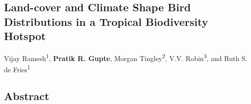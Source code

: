 \begin{refsection}

\chapter{Land-cover and Climate Shape Bird Distributions in a Tropical Biodiversity Hotspot}\label{ch:hillybirds}

{\noindent Vijay Ramesh\textsuperscript{1}, \textbf{Pratik R. Gupte}, Morgan Tingley\textsuperscript{2}, V.V. Robin\textsuperscript{3}, and Ruth S. de Fries\textsuperscript{1}}


\section*{Abstract}


\end{refsection}
